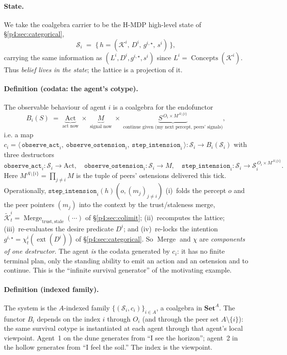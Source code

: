 \documentclass{article}
\newcommand{\method}[1]{\texttt{#1}}
\begin{document}
\paragraph{State.} We take the coalgebra carrier to be the H-MDP high-level
state of \S\ref{p4:sec:categorical},
\[
  \mathcal{S}_i \;=\; \big\{\, h=(\mathcal{K}^i,\,D^i,\,g^{i,\star},\,s^i) \,\big\},
\]
carrying the same information as $(L^i,D^i,g^{i,\star},s^i)$ since
$L^i=\operatorname{Concepts}(\mathcal K^i)$. Thus \emph{belief lives in the
state}; the lattice is a projection of it.

\paragraph{Definition (codata: the agent's cotype).}
The observable behaviour of agent $i$ is a coalgebra for the endofunctor
\[
  B_i(S)\;=\;\underbrace{\mathrm{Act}}_{\text{act now}}\;\times\;
            \underbrace{M}_{\text{signal now}}\;\times\;
            \underbrace{S^{\,O_i\times M^{A\setminus\{i\}}}}_{\text{continue given (my next percept, peers' signals)}},
\]
i.e. a map $c_i=\big\langle\, \method{observe\_act}_i,\ \method{observe\_ostension}_i,\ \method{step\_intension}_i \,\big\rangle : \mathcal{S}_i \to B_i(\mathcal{S}_i)$ with three destructors
\[
  \method{observe\_act}_i:\mathcal{S}_i\to\mathrm{Act},\quad
  \method{observe\_ostension}_i:\mathcal{S}_i\to M,\quad
  \method{step\_intension}_i:\mathcal{S}_i\to \mathcal{S}_i^{\,O_i\times M^{A\setminus\{i\}}} .
\]
Here $M^{A\setminus\{i\}}=\prod_{j\neq i}M$ is the tuple of peers' ostensions
delivered this tick. Operationally, $\method{step\_intension}_i(h)(o,(m_j)_{j\neq i})$
(i)~folds the percept $o$ and the peer pointers $(m_j)$ into the context by
the trust/staleness merge, $\widetilde{\mathcal K}_t^i=\operatorname{Merge}_{\mathrm{trust,stale}}(\cdots)$
of \S\ref{p4:sec:colimit}; (ii)~recomputes the lattice; (iii)~re-evaluates the
desire predicate $D^i$; and (iv)~re-locks the intention
$g^{i,\star}=\chi_t^i(\operatorname{ext}(D^i))$ of \S\ref{p4:sec:categorical}.
So $\operatorname{Merge}$ and $\chi$ are \emph{components of one destructor}.
The agent \emph{is} the codata generated by $c_i$: it has no finite terminal
plan, only the standing ability to emit an action and an ostension and to
continue. This is the ``infinite survival generator'' of the motivating
example.

\paragraph{Definition (indexed family).}
The system is the $A$-indexed family $\{(\mathcal{S}_i,c_i)\}_{i\in A}$, a
coalgebra in $\mathbf{Set}^{A}$. The functor $B_i$ depends on the index $i$
through $O_i$ (and through the peer set $A\setminus\{i\}$): the same survival
cotype is instantiated at each agent through that agent's local viewpoint.
Agent~1 on the dune generates from ``I see the horizon''; agent~2 in the
hollow generates from ``I feel the soil.'' The index is the viewpoint.
\end{document}
